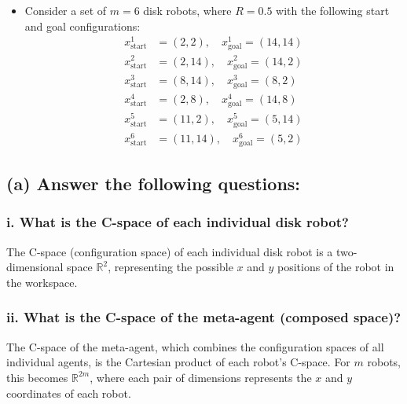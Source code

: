 \documentclass{article}
\begin{document}
{\begin{itemize}
\[\begin{aligned}
        W O_4: & \quad v_1^4 = (10, 6), \quad v_2^4 = (12, 6), \quad v_3^4 = (12, 7), \quad v_4^4 = (10, 7) \\
        W O_5: & \quad v_1^5 = (11, 6), \quad v_2^5 = (12, 6), \quad v_3^5 = (12, 10), \quad v_4^5 = (11, 10) \\
        W O_6: & \quad v_1^6 = (10, 9), \quad v_2^6 = (12, 9), \quad v_3^6 = (12, 10), \quad v_4^6 = (10, 10)
    \end{aligned}
    \]
    \item Consider a set of \( m = 6 \) disk robots, where \( R = 0.5 \) with the following start and goal configurations:
    \[
    \begin{aligned}
        x_{\text{start}}^1 &= (2, 2), \quad x_{\text{goal}}^1 = (14, 14) \\
        x_{\text{start}}^2 &= (2, 14), \quad x_{\text{goal}}^2 = (14, 2) \\
        x_{\text{start}}^3 &= (8, 14), \quad x_{\text{goal}}^3 = (8, 2) \\
        x_{\text{start}}^4 &= (2, 8), \quad x_{\text{goal}}^4 = (14, 8) \\
        x_{\text{start}}^5 &= (11, 2), \quad x_{\text{goal}}^5 = (5, 14) \\
        x_{\text{start}}^6 &= (11, 14), \quad x_{\text{goal}}^6 = (5, 2)
    \end{aligned}
    \]
\end{itemize}
}

\subsection*{(a) Answer the following questions:}

\subsubsection*{i. What is the C-space of each individual disk robot?}

The C-space (configuration space) of each individual disk robot is a two-dimensional space \( \mathbb{R}^2 \), representing the possible \(x\) and \(y\) positions of the robot in the workspace.

\subsubsection*{ii. What is the C-space of the meta-agent (composed space)?}

The C-space of the meta-agent, which combines the configuration spaces of all individual agents, is the Cartesian product of each robot's C-space. For \(m\) robots, this becomes \( \mathbb{R}^{2m} \), where each pair of dimensions represents the \(x\) and \(y\) coordinates of each robot.
\end{document}
